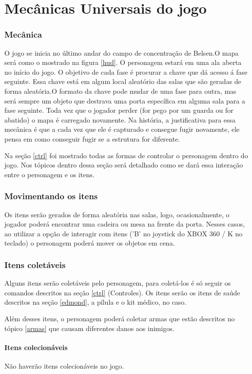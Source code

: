 \part*{Mecânicas Universais do jogo}
\section{Mecânica}
 O jogo se inicia no último andar do campo de concentração de Belsen.O mapa será como o mostrado na figura \ref{hud}. O personagem estará em uma ala aberta no início do jogo. O objetivo de cada fase é procurar a chave que dá acesso á fase seguinte. Essa chave está em algum local aleatório das salas que são geradas de forma aleatória.O formato da chave pode mudar de uma fase para outra, mas será sempre um objeto que destrava uma porta específica em alguma sala para a fase seguinte. Toda vez que o jogador perder (for pego por um guarda ou for abatido) o mapa é carregado novamente. Na história, a justificativa para essa mecânica é que a cada vez que ele é capturado e consegue fugir novamente, ele pensa em como conseguir fugir se a estrutura for diferente.

Na seção \ref{ctrl} foi mostrado todas as formas de controlar o personagem dentro do jogo. Nos tópicos dentro dessa seção será detalhado como se dará essa interação entre o personagem e os itens.

\section{Movimentando os itens}
Os itens serão gerados de forma aleatória nas salas, logo, ocasionalmente, o jogador poderá encontrar uma cadeira ou mesa na frente da porta. Nesses casos, ao utilizar a opção de interagir com itens ('B' no joystick do XBOX 360 / K no teclado) o personagem poderá mover os objetos em cena.

\section{Itens coletáveis}
Alguns itens serão coletáveis pelo personagem, para coletá-los é só seguir os comandos descritos na seção \ref{ctrl} (Controles). Os itens serão os itens de saúde descritos na seção \ref{edmond}, a pílula e o kit médico, no caso.

Além desses itens, o personagem poderá coletar armas que estão descritos no tópico \ref{armas} que causam diferentes danos aos inimigos.

\subsection{\label{colecionaveis}{Itens colecionáveis}}
Não haverão itens colecionáveis no jogo.

